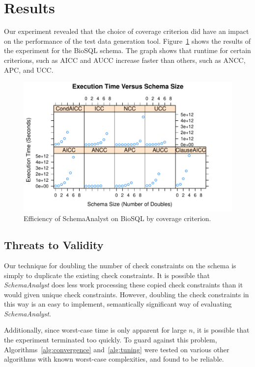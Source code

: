 \section{Results}
  \label{sec:results}

Our experiment revealed that the choice of coverage criterion did have an impact
on the performance of the test data generation tool. 
Figure~\ref{fig:crites} shows the results of the experiment for the BioSQL
schema.  The graph shows that runtime for certain criterions, such as AICC and AUCC increase faster than others, such as ANCC, APC, and
UCC.

\begin{figure}
\centering
  \centering
  \includegraphics[width=1\linewidth]{../diagrams/TimevsSizeBioSqlDoubleAllonCriterion.pdf}
  \caption{Efficiency of SchemaAnalyst on BioSQL by coverage criterion.}
  \label{fig:crites}
  \vspace{-.15in} 
\end{figure}


\subsection*{Threats to Validity}

Our technique for doubling the number of check constraints on the schema
is simply to duplicate the existing check constraints. It is possible
that \textit{SchemaAnalyst} does less work processing these copied check
constraints than it would given unique check constraints. However,
doubling the check constraints in this way is an easy to implement,
semantically significant way of evaluating \textit{SchemaAnalyst}.

Additionally, since worst-case time is only apparent for large $n$, 
it is possible that the experiment terminated too quickly.  To guard 
against this problem, Algorithms~\ref{alg:convergence} and~\ref{alg:tuning}
were tested on various other algorithms with known worst-case complexities, and 
found to be reliable.
